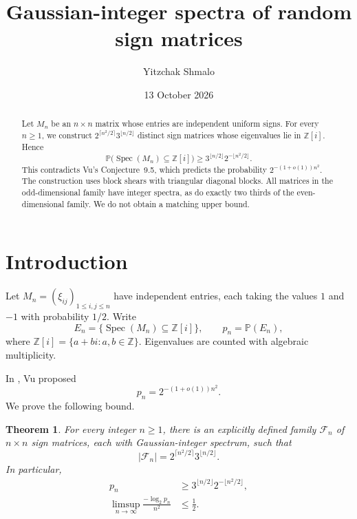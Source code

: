 \documentclass[11pt]{amsart}
\title{Gaussian-integer spectra of random sign matrices}
\author{Yitzchak Shmalo}
\date{13 October 2026}
\newtheorem{theorem}{Theorem}[section]
\theoremstyle{definition}
\theoremstyle{remark}
\newcommand{\Z}{\mathbb Z}
\newcommand{\Pp}{\mathbb P}
\newcommand{\F}{\mathcal F}
\DeclareMathOperator{\Spec}{Spec}
\numberwithin{equation}{section}
\begin{document}
\begin{abstract}
Let $M_n$ be an $n\times n$ matrix whose entries are independent uniform signs. For every $n\geq1$, we construct $2^{\lceil n^2/2\rceil}3^{\lfloor n/2\rfloor}$ distinct sign matrices whose eigenvalues lie in $\Z[i]$. Hence
\[
 \Pp\bigl(\Spec(M_n)\subseteq\Z[i]\bigr)
 \geq 3^{\lfloor n/2\rfloor}2^{-\lfloor n^2/2\rfloor}.
\]
This contradicts Vu's Conjecture~9.5, which predicts the probability $2^{-(1+o(1))n^2}$. The construction uses block shears with triangular diagonal blocks. All matrices in the odd-dimensional family have integer spectra, as do exactly two thirds of the even-dimensional family. We do not obtain a matching upper bound.
\end{abstract}
\maketitle

\section{Introduction}

Let $M_n=(\xi_{ij})_{1\leq i,j\leq n}$ have independent entries, each taking the values $1$ and $-1$ with probability $1/2$. Write
\begin{equation}\label{eq:event}
 E_n=\{\Spec(M_n)\subseteq\Z[i]\},\qquad p_n=\Pp(E_n),
\end{equation}
where $\Z[i]=\{a+bi:a,b\in\Z\}$. Eigenvalues are counted with algebraic multiplicity.

In \cite[Conjecture~9.5]{Vu2021}, Vu proposed
\begin{equation}\label{eq:conjecture}
 p_n=2^{-(1+o(1))n^2}.
\end{equation}
We prove the following bound.

\begin{theorem}\label{thm:main}
For every integer $n\geq1$, there is an explicitly defined family $\F_n$ of $n\times n$ sign matrices, each with Gaussian-integer spectrum, such that
\begin{equation}\label{eq:family-size}
 |\F_n|=2^{\lceil n^2/2\rceil}3^{\lfloor n/2\rfloor}.
\end{equation}
In particular,
\begin{align}
 p_n&\geq3^{\lfloor n/2\rfloor}2^{-\lfloor n^2/2\rfloor},\label{eq:main-bound}\\
 \limsup_{n\to\infty}\frac{-\log_2 p_n}{n^2}&\leq\frac12.\label{eq:rate}
\end{align}
\end{theorem}
\end{document}
